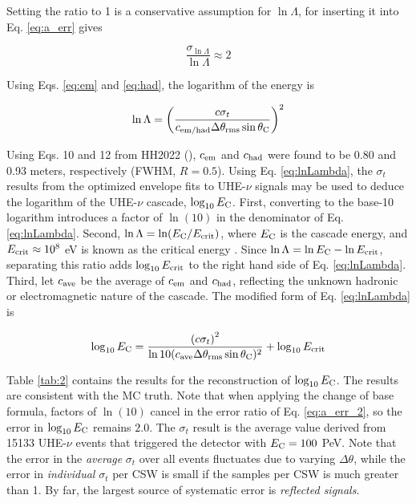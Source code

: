 \documentclass[amsmath,amssymb,aps,prd,10pt,twocolumn,showkeys]{revtex4}
\begin{document}
Setting the ratio to 1 is a conservative assumption for $\ln\Lambda$, for inserting it into Eq. \ref{eq:a_err} gives

\begin{equation}
\frac{\sigma_{\ln\Lambda}}{\ln\Lambda} \approx 2 \label{eq:a_err_2}
\end{equation}

Using Eqs. \ref{eq:em} and \ref{eq:had}, the logarithm of the energy is

\begin{equation}
\ln\Lambda = \left( \frac{c\sigma_t}{c_{\rm em/had} \Delta\theta_{\rm rms}\sin\theta_{\rm C}} \right)^2 \label{eq:lnLambda}
\end{equation}

Using Eqs. 10 and 12 from HH2022 (\cite{PhysRevD.105.123019}), $c_{\rm em}$ and $c_{\rm had}$ were found to be 0.80 and 0.93 meters, respectively (FWHM, $R=0.5$).  Using Eq. \ref{eq:lnLambda}, the $\sigma_t$ results from the optimized envelope fits to UHE-$\nu$ signals may be used to deduce the logarithm of the UHE-$\nu$ cascade, $\log_{10} E_{\rm C}$.  First, converting to the base-10 logarithm introduces a factor of $\ln(10)$ in the denominator of Eq. \ref{eq:lnLambda}.  Second, $\ln\Lambda = \ln(E_{\rm C}/E_{\rm crit})$, where $E_{\rm C}$ is the cascade energy, and $E_{\rm crit}\approx 10^8$ eV is known as the critical energy \cite{PhysRevD.105.123019}.  Since $\ln\Lambda = \ln E_{\rm C} - \ln E_{\rm crit}$, separating this ratio adds $\log_{10} E_{\rm crit}$ to the right hand side of Eq. \ref{eq:lnLambda}.  Third, let $c_{\rm ave}$ be the average of $c_{\rm em}$ and $c_{\rm had}$, reflecting the unknown hadronic or electromagnetic nature of the cascade.  The modified form of Eq. \ref{eq:lnLambda} is

\begin{equation}
\log_{10} E_{\rm C} = \frac{\left( c\sigma_t \right)^2}{\ln 10(c_{\rm ave} \Delta\theta_{\rm rms}\sin\theta_{\rm C})^2} + \log_{10} E_{\rm crit} \label{eq:lnLambda_2}
\end{equation}

Table \ref{tab:2} contains the results for the reconstruction of $\log_{10}E_{\rm C}$.  The results are consistent with the MC truth.  Note that when applying the change of base formula, factors of $\ln(10)$ cancel in the error ratio of Eq. \ref{eq:a_err_2}, so the error in $\log_{10} E_{\rm C}$ remains $2.0$.  The $\sigma_t$ result is the average value derived from 15133 UHE-$\nu$ events that triggered the detector with $E_{\rm C} = 100$ PeV.  Note that the error in the \textit{average} $\sigma_t$ over all events fluctuates due to varying $\Delta\theta$, while the error in \textit{individual} $\sigma_t$ per CSW is small if the samples per CSW is much greater than 1.  By far, the largest source of systematic error is \textit{reflected signals}.
\end{document}
